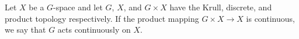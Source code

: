 Let $X$ be a $G$-space and let $G$, $X$, and $G \times X$ have the Krull, discrete, and product topology respectively. If the product mapping $G \times X \to X$ is continuous, we say that $G$ acts continuously on $X$.
